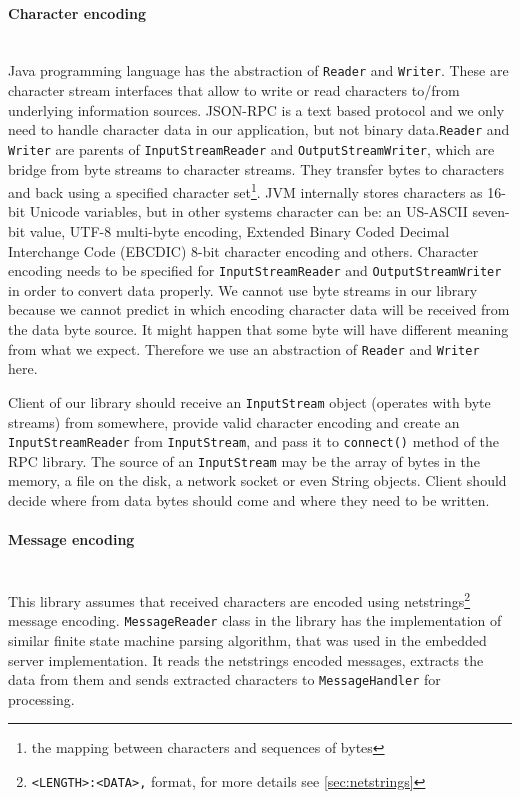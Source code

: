 \paragraph{Character encoding} ~\\
Java programming language has the abstraction of \texttt{Reader} and
\texttt{Writer}. These are character stream interfaces that allow to write or
read characters to/from underlying information sources. JSON-RPC is a text
based protocol and we only need to handle character data in our application, but
not binary data.\texttt{Reader} and \texttt{Writer} are parents of
\texttt{InputStreamReader} and \texttt{OutputStreamWriter}, which are bridge
from byte streams to character streams. They transfer bytes to characters and
back using a specified character set\footnote{the mapping between characters and sequences of bytes}.
JVM internally stores characters as 16-bit Unicode variables, but in other
systems character can be:  an US-ASCII seven-bit value, UTF-8 multi-byte
encoding, Extended Binary Coded Decimal Interchange Code (EBCDIC) 8-bit
character encoding and others. Character encoding needs to be specified for
\texttt{InputStreamReader} and \texttt{OutputStreamWriter} in order to convert
data properly. We cannot use byte streams in our library because we cannot
predict in which encoding character data will be received from the data byte
source. It might happen that some byte will have different meaning from what we
expect. Therefore we use an abstraction of \texttt{Reader} and
\texttt{Writer} here.

Client of our library should receive an \texttt{InputStream}  object (operates
with byte streams) from somewhere, provide valid character encoding and create
an \texttt{InputStreamReader} from \texttt{InputStream}, and pass it to
\texttt{connect()} method of the RPC library. The source of an
\texttt{InputStream} may be the array of bytes in the memory, a file on the
disk, a network socket or even String objects. Client should decide where from
data bytes should come and where they need to be written.

\paragraph{Message encoding} ~\\

This library assumes that received characters are encoded using
netstrings\footnote{ \texttt{<LENGTH>:<DATA>,} format, for more details see
\autoref{sec:netstrings} } message encoding.
\texttt{MessageReader} class in the library has the implementation of similar finite
state machine parsing algorithm, that was used in the embedded server implementation.
It reads the netstrings encoded messages, extracts the data from them and sends extracted characters to
\texttt{MessageHandler} for processing.


